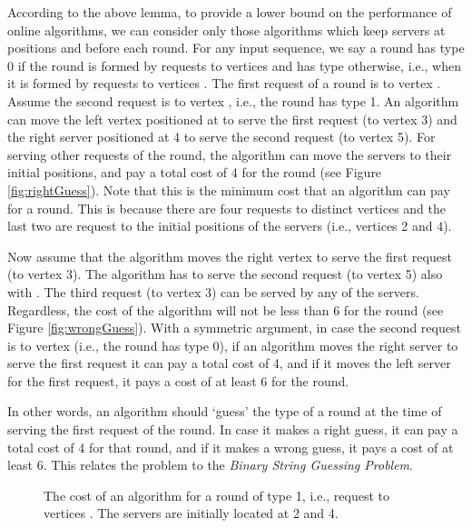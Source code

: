 According to the above lemma, to provide a lower bound on the performance of online algorithms, we can consider only those algorithms which keep servers at positions  and  before each round.
For any input sequence, we say a round  has type 0 if the round is formed by requests to vertices  and has type  otherwise, i.e., when it is formed by requests to vertices .
The first request of a round is to vertex . Assume the second request is to vertex , i.e., the round has type 1. An algorithm can move the left vertex  positioned at  to serve the first request (to vertex 3) and the right server  positioned at 4 to serve the second request (to vertex 5). For serving other requests of the round, the algorithm can move the servers to their initial positions, and pay a total cost of 4 for the round (see Figure \ref{fig:rightGuess}). Note that this is the minimum cost that an algorithm can pay for a round. This is because there are four requests to distinct vertices and the last two are request to the initial positions of the servers (i.e., vertices 2 and 4).

Now assume that the algorithm moves the right vertex  to serve the first request (to vertex 3). The algorithm has to serve the second request (to vertex 5) also with . The third request (to vertex 3) can be served by any of the servers. Regardless, the cost of the algorithm will not be less than 6 for the round (see Figure \ref{fig:wrongGuess}). 
With a symmetric argument, in case the second request is to vertex  (i.e., the round has type 0), if an algorithm moves the right server to serve the first request it can pay a total cost of 4, and if it moves the left server for the first request, it pays a cost of at least 6 for the round. 

In other words, an algorithm should `guess' the type of a round at the time of serving the first request of the round. In case it makes a right guess, it can pay a total cost of 4 for that round, and if it makes a wrong guess, it pays a cost of at least 6. This relates the problem to the \textit{Binary String Guessing Problem}. 

\begin{figure}[!t]
\centering
\hspace{.095\columnwidth}
\caption{The cost of an algorithm for a round of type 1, i.e., request to vertices . The servers are initially located at 2 and 4.}
\label{packs}\end{figure}


